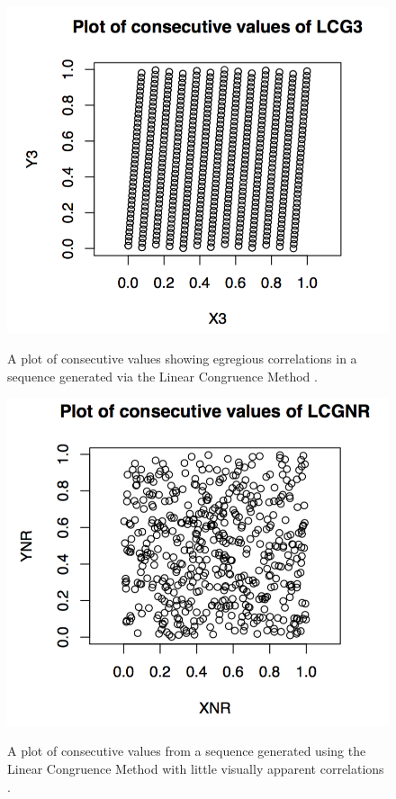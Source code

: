 \documentclass{article}
\theoremstyle{break}
\begin{document}
\begin{figure}[!tbp]
  \centering
  \begin{minipage}[b]{0.4\textwidth}
  \centering
    \includegraphics[width=\textwidth]{LCG3_consecutive_values.png}
    \label{fig:high_correlation}\caption{A plot of consecutive values showing egregious correlations in a sequence generated via the Linear Congruence Method \autocite{burgoine_testing_2013}.}  \end{minipage}
  \hspace{1 cm}
  \begin{minipage}[b]{0.4\textwidth}
 	 \centering
    \includegraphics[width=\textwidth]{LCGNR_consecutive_values.png} \label{fig:low_correlation}\caption{ A plot of consecutive values from a sequence generated using the Linear Congruence Method  with little visually apparent correlations \autocite{burgoine_testing_2013}.}
  \end{minipage}
\end{figure}
\end{document}
